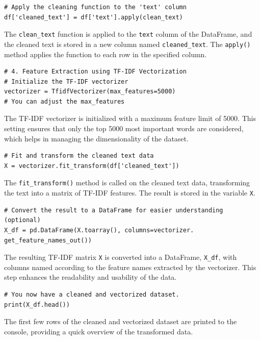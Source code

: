 \begin{verbatim}
# Apply the cleaning function to the 'text' column
df['cleaned_text'] = df['text'].apply(clean_text)
\end{verbatim}

\noindent
The \texttt{clean\_text} function is applied to the \texttt{text} column of the DataFrame, and the cleaned text is stored in a new column named \texttt{cleaned\_text}. The \texttt{apply()} method applies the function to each row in the specified column.

\begin{verbatim}
# 4. Feature Extraction using TF-IDF Vectorization
# Initialize the TF-IDF vectorizer
vectorizer = TfidfVectorizer(max_features=5000)  
# You can adjust the max_features
\end{verbatim}

\noindent
The TF-IDF vectorizer is initialized with a maximum feature limit of 5000. This setting ensures that only the top 5000 most important words are considered, which helps in managing the dimensionality of the dataset.

\begin{verbatim}
# Fit and transform the cleaned text data
X = vectorizer.fit_transform(df['cleaned_text'])
\end{verbatim}

\noindent
The \texttt{fit\_transform()} method is called on the cleaned text data, transforming the text into a matrix of TF-IDF features. The result is stored in the variable \texttt{X}.

\begin{verbatim}
# Convert the result to a DataFrame for easier understanding (optional)
X_df = pd.DataFrame(X.toarray(), columns=vectorizer.
get_feature_names_out())
\end{verbatim}

\noindent
The resulting TF-IDF matrix \texttt{X} is converted into a DataFrame, \texttt{X\_df}, with columns named according to the feature names extracted by the vectorizer. This step enhances the readability and usability of the data.

\begin{verbatim}
# You now have a cleaned and vectorized dataset.
print(X_df.head())
\end{verbatim}

\noindent
The first few rows of the cleaned and vectorized dataset are printed to the console, providing a quick overview of the transformed data.

